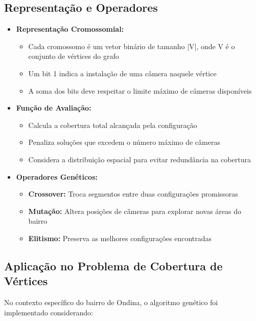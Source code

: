 \documentclass[12pt, a4paper]{report}
\begin{document}
\subsection{Representação e Operadores}
\begin{itemize}
    \item \textbf{Representação Cromossomial:}
    \begin{itemize}
        \item Cada cromossomo é um vetor binário de tamanho |V|, onde V é o conjunto de vértices do grafo
        \item Um bit 1 indica a instalação de uma câmera naquele vértice
        \item A soma dos bits deve respeitar o limite máximo de câmeras disponíveis
    \end{itemize}
    
    \item \textbf{Função de Avaliação:}
    \begin{itemize}
        \item Calcula a cobertura total alcançada pela configuração
        \item Penaliza soluções que excedem o número máximo de câmeras
        \item Considera a distribuição espacial para evitar redundância na cobertura
    \end{itemize}
    
    \item \textbf{Operadores Genéticos:}
    \begin{itemize}
        \item \textbf{Crossover:} Troca segmentos entre duas configurações promissoras
        \item \textbf{Mutação:} Altera posições de câmeras para explorar novas áreas do bairro
        \item \textbf{Elitismo:} Preserva as melhores configurações encontradas
    \end{itemize}
\end{itemize}

\subsection{Aplicação no Problema de Cobertura de Vértices}
No contexto específico do bairro de Ondina, o algoritmo genético foi implementado considerando:
\end{document}
